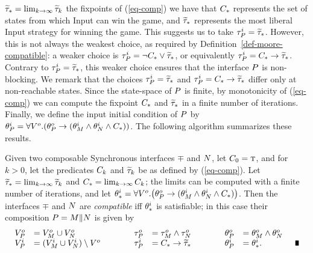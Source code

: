 $\widetilde{\tau}_* = \lim_{k \rightarrow \infty} \widetilde{\tau}_k$ the fixpoints of
(\ref{eq-comp}) we have that $C_*$ represents the set of
states from which Input can win the game, and $\widetilde{\tau}_*$ represents
the most liberal Input
strategy %
for winning the game. This suggests us to take $\tau^i_P =
\widetilde{\tau}_*$. However, this is not always the weakest choice, as
required by Definition~\ref{def-moore-compatible}: a weaker choice
is $\tau^i_P = \neg C_* \vee \widetilde{\tau}_*$, or equivalently
$\tau^i_P = C_* \rightarrow \widetilde{\tau}_*$. Contrary to $\tau^i_P =
\widetilde{\tau}_*$, this weaker choice ensures that the interface $P$ is
non-blocking. We remark that the choices $\tau^i_P = \widetilde{\tau}_*$
and $\tau^i_P = C_* \rightarrow \widetilde{\tau}_*$ differ only at
non-reachable states. Since the state-space of $P$ is finite, by
monotonicity of (\ref{eq-comp}) we can compute the fixpoint
$C_*$ and $\widetilde{\tau}_*$ in a finite number of iterations.
Finally, we define the input initial condition of $P$ by $
  \theta^i_P = \forall {V}^o .
  ( \theta^o_P \rightarrow (\theta^i_M \wedge \theta^i_N \wedge C_*) )
$. The following algorithm summarizes these results.

\begin{algo}{}
Given two composable Synchronous interfaces $\mp$ and $N$, let
$C_0 = \mbox{\sc t}$, and for $k > 0$, let the predicates $C_k$
and $\widetilde{\tau}_k$ be as defined by (\ref{eq-comp}). Let $\widetilde{\tau}_* =
\lim_{k \rightarrow \infty} \widetilde{\tau}_k$ and $C_* = \lim_{k \rightarrow \infty}
C_k$; the limits can be computed with a finite number of
iterations, and let $\theta^i_* = \forall {V}^o . \bigl( \theta^o_P
\rightarrow (\theta^i_M \wedge \theta^i_N \wedge C_*) \bigr)$. Then the
interfaces $\mp$ and $N$ are {\em compatible} iff $\theta^i_*$ is
satisfiable; in this case their composition $P = M \| N$ is
given by
\[
\begin{array}{rlcrlcrl}
\ovars_\mr  & = \ovars_\mp \union \ovars_\mq & \hspace*{2em} &
\otrans_\mr & = \otrans_\mp \und \otrans_\mq & \hspace*{2em} &
\oinit_\mr  & = \oinit_\mp \und \oinit_\mq \\
%
\ivars_\mr  & = (\ivars_\mp \union \ivars_\mq) \setm \ovars &
\hspace*{2em} & \itrans_\mr & = \ctrl_* \imply \htau_* &
\hspace*{2em} & \iinit_\mr  & = \iinit_*. \hspace{4em} \qed
\end{array}
\]
\end{algo}


